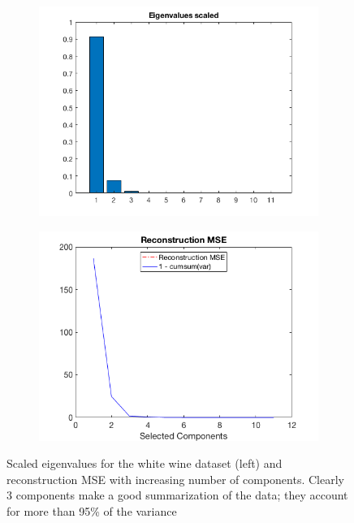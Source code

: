 \documentclass[a4paper, 10pt]{article}
\begin{document}
  \begin{figure}[ht]
    \centering
    \begin{subfigure}[t]{0.4\linewidth}
      \includegraphics[width=1\linewidth]{./project/wine_eigvals.png}
    \end{subfigure}
    \begin{subfigure}[t]{0.4\linewidth}
      \includegraphics[width=1\linewidth]{./project/wine_rec_MSE.png}
    \end{subfigure}
    \caption{Scaled eigenvalues for the white wine dataset (left) and
    reconstruction MSE with increasing number of components. Clearly 3
    components make a good summarization of the data; they account for more than
    95\% of the variance}
    \label{fig:l5_PC}
  \end{figure}
\end{document}
